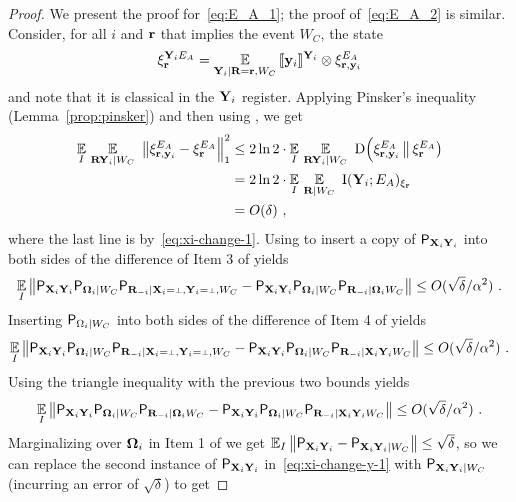 \begin{proof}
We present the proof for~\eqref{eq:E_A_1}; the proof of~\eqref{eq:E_A_2} is similar. Consider, for all $i$ and $\br$ that implies the event $W_C$, the state
\[
	\xi_{\br}^{\bY_i E_A} = \Ex_{\bY_i | \bR = \br, W_C} \, \puretomixed{\by_i}^{\bY_i} \otimes \xi_{\br,\by_i}^{E_A}
\]
and note that it is classical in the $\bY_i$ register.
Applying Pinsker's inequality (Lemma~\ref{prop:pinsker}) and then using ,   we get
\begin{align}
\Ex_I \, \Ex_{\bR \bY_i | W_C} \,\, \big \| \xi^{E_A}_{\br,\by_i} -  \xi^{E_A}_{\br} \Big \|_1^2 &\leq 2  \ln 2 \cdot \Ex_I \,\Ex_{\bR \bY_i | W_C} \,\,  \D \Big(  \xi^{E_A}_{\br,\by_i} \, \big \|\, \xi^{E_A}_{\br} \big )\notag\\
&= 2\ln 2\cdot \Ex_I \, \Ex_{\bR | W_C} \,\,  \I (\bY_i ; E_A)_{\xi_\br} \notag\\
& = O(\delta)~,\label{eq:claim24-1a}
\end{align} 
where the last line is by~\eqref{eq:xi-change-1}. Using  to insert a copy of $\P_{\bX_i \bY_i}$ into both sides of the difference of Item 3 of  yields
\[
\Ex_I \left \|  \P_{\bX_i \bY_i} \P_{\bOmega_i | W_C} \P_{\bR_\mi | \bX_i = \dummy, \bY_i =\dummy,  W_C} - \P_{\bX_i \bY_i} \P_{\bOmega_i | W_C} \P_{\bR_\mi | \bOmega_i W_C} \right \| \leq O(\sqrt{\delta}/\alpha^2)~.
\]
Inserting $\P_{\Omega_i | W_C}$ into both sides of the difference of Item 4 of  yields
\[
\Ex_I \left \|  \P_{\bX_i \bY_i} \P_{\bOmega_i | W_C} \P_{\bR_\mi | \bX_i = \dummy, \bY_i =\dummy,  W_C} - \P_{\bX_i \bY_i} \P_{\bOmega_i | W_C} \P_{\bR_\mi | \bX_i \bY_i  W_C} \right \| \leq O(\sqrt{\delta}/\alpha^2)~.
\]
Using the triangle inequality with the previous two bounds yields
\begin{equation}
\label{eq:xi-change-y-1}
\Ex_I \left \|  \P_{\bX_i \bY_i} \P_{\bOmega_i | W_C} \P_{\bR_\mi | \bOmega_i  W_C} - \P_{\bX_i \bY_i}  \P_{\bOmega_i | W_C} \P_{\bR_\mi | \bX_i \bY_i  W_C} \right \| \leq O(\sqrt{\delta}/\alpha^2)~.
\end{equation}
Marginalizing over $\bOmega_i$ in Item 1 of  we get $\Ex_I \left \| \P_{\bX_i \bY_i} - \P_{\bX_i \bY_i | W_C} \right \| \leq \sqrt{\delta}$, so we can replace the second instance of $\P_{\bX_i \bY_i}$ in~\eqref{eq:xi-change-y-1} with $\P_{\bX_i \bY_i | W_C}$ (incurring an error of $\sqrt{\delta}$) to get

\end{proof}

